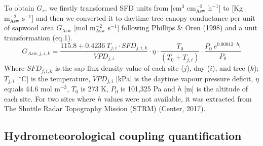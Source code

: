 \documentclass[11pt,twoside]{reedthesis}
\begin{document}
To obtain \(G_s\), we firstly transformed SFD units from
{[}\(\text{cm}^3\) \(\text{cm}^{-2}_{\text{Asw}}\) \(\text{h}^{-1}\){]}
to {[}Kg \(\text{m}^{-2}_{\text{Asw}}\) \(\text{s}^{-1}\){]} and then we
converted it to daytime tree canopy conductance per unit of sapwood area
\(G_{\text{Asw}}\) {[}mol \(\text{m}^{-2}_{\text{Asw}}\)
\(\text{s}^{-1}\){]} following Phillips \& Oren (1998) and a unit
transformation (eq.1).
\begin{equation}
G_{Asw,j,i,k} = \frac{115.8 + 0.4236 \: T_{j , i} \cdot SFD_{j , i , k}}{VPD_{j,i}}\cdot \eta \cdot \frac{T_0}{(T_0 + T_{j,i})} \cdot \frac{P_0 \: e^{0.00012 \cdot h_i}}{P_0}
\end{equation}
Where \(SFD_{j,i,k}\) is the sap flux density value of each site
(\(j\)), day (\(i\)), and tree (\(k\)); \({T}_{j,i}\)
{[}\(^{\circ}\)C{]} is the temperature, \(VPD_{j,i}\) {[}kPa{]} is the
daytime vapour pressure deficit, \(\eta\) equals 44.6 mol
\(\text{m}^{-3}\), \(T_0\) is 273 K, \(P_0\) is 101,325 Pa and \(h\)
{[}m{]} is the altitude of each site. For two sites where \(h\) values
were not available, it was extracted from The Shuttle Radar Topography
Mission (STRM) (Center, 2017).\par

\subsection{Hydrometeorological coupling
quantification}\label{hydrometeorological-coupling-quantification}
\end{document}
